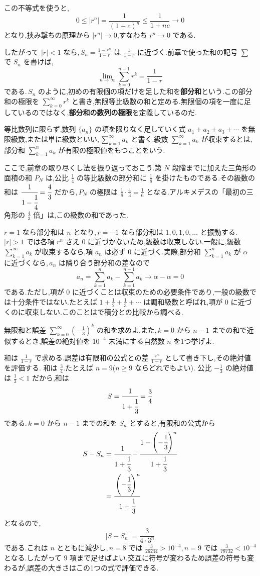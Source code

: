 この不等式を使うと,
\[
 0\le |r^n|=\frac1{(1+c)^n}\le\frac1{1+nc}\longrightarrow0
\]
となり,挟み撃ちの原理から $|r^n|\to0$,すなわち $r^n\to0$ である.

したがって $|r|<1$ なら,\,$S_n=\frac{1-r^n}{1-r}$ は $\frac1{1-r}$ に近づく.前章で使った和の記号 $\sum$ で $S_n$ を書けば,
\[
 \lim_{n\to\infty}\sum_{k=0}^{n-1}r^k
 =\frac1{1-r}
\]
である.\,$S_n$ のように,初めの有限個の項だけを足した和を\textbf{部分和}という.この部分和の極限を $\sum_{k=0}^{\infty}r^k$ と書き,無限等比級数の和と定める.無限個の項を一度に足しているのではなく,\textbf{部分和の数列の極限}を定義しているのだ.

等比数列に限らず,数列 $\{a_n\}$ の項を限りなく足していく式 $a_1+a_2+a_3+\cdots$ を無限級数,または単に級数といい,\,$\sum_{k=1}^{\infty}a_k$ と書く.級数 $\sum_{k=1}^{\infty}a_k$ が収束するとは,部分和 $\sum_{k=1}^{n}a_k$ が有限の極限値をもつことをいう.

ここで,前章の取り尽くし法を振り返っておこう.第 $N$ 段階までに加えた三角形の面積の和 $P_N$ は,公比 $\frac14$ の等比級数の部分和に $\frac18$ を掛けたものである.その級数の和は $\cfrac1{1-\cfrac14}=\cfrac43$ だから,\,$P_N$ の極限は $\frac18\cdot\frac43=\frac16$ となる.アルキメデスの「最初の三角形の $\frac43$ 倍」は,この級数の和であった.

$r=1$ なら部分和は $n$ となり,\,$r=-1$ なら部分和は $1,0,1,0,\ldots$ と振動する.\,$|r|>1$ では各項 $r^n$ さえ $0$ に近づかないため,級数は収束しない.一般に,級数 $\sum_{k=1}^{\infty}a_k$ が収束するなら,項 $a_n$ は必ず $0$ に近づく.実際,部分和 $\sum_{k=1}^{n}a_k$ が $\alpha$ に近づくなら,\,$a_n$ は隣り合う部分和の差なので
\[
 a_n=\sum_{k=1}^{n}a_k-\sum_{k=1}^{n-1}a_k\longrightarrow\alpha-\alpha=0
\]
である.ただし,項が $0$ に近づくことは収束のための必要条件であり,一般の級数では十分条件ではない.たとえば $1+\frac12+\frac13+\cdots$ は調和級数と呼ばれ,項が $0$ に近づくのに収束しない.このことはで積分との比較から調べる.

\begin{example}{無限和と誤差}
$\sum_{k=0}^{\infty}\left(-\frac13\right)^k$ の和を求めよ.また,\,$k=0$ から $n-1$ までの和で近似するとき,誤差の絶対値を $10^{-4}$ 未満にする自然数 $n$ を1つ挙げよ.
\end{example}
和は $\frac1{1-r}$ で求める.誤差は有限和の公式との差 $\frac{r^n}{1-r}$ として書き下し,その絶対値を評価する.
和は $\frac34$.たとえば $n=9$($n\ge9$ ならどれでもよい).
公比 $-\frac13$ の絶対値は $\frac13<1$ だから,和は
\[
 S=\cfrac{1}{1+\cfrac13}=\frac34
\]
である.\,$k=0$ から $n-1$ までの和を $S_n$ とすると,有限和の公式から
\begin{align*}
 S-S_n&=\cfrac{1}{1+\cfrac13}-\cfrac{1-\left(-\cfrac13\right)^n}{1+\cfrac13}\\
 &=\cfrac{\left(-\cfrac13\right)^n}{1+\cfrac13}
\end{align*}
となるので,
\[
 |S-S_n|=\frac{3}{4\cdot3^n}
\]
である.これは $n$ とともに減少し,\,$n=8$ では $\frac{3}{26244}>10^{-4}$,\,$n=9$ では $\frac{3}{78732}<10^{-4}$ となる.したがって $9$ 項まで足せばよい.交互に符号が変わるため誤差の符号も変わるが,誤差の大きさはこの1つの式で評価できる.

